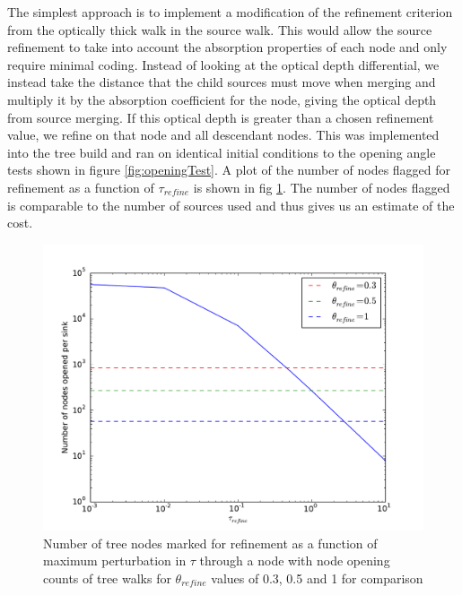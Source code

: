 The simplest approach is to implement a modification of the refinement criterion from the optically thick walk in the source walk. This would allow the source refinement to take into account the absorption properties of each node and only require minimal coding. Instead of looking at the optical depth differential, we instead take the distance that the child sources must move when merging and multiply it by the absorption coefficient for the node, giving the optical depth from source merging. If this optical depth is greater than a chosen refinement value, we refine on that node and all descendant nodes.
\iffalse
This was implemented into the tree build and ran on identical initial conditions to the opening angle tests shown in figure \ref{fig:openingTest}. A plot of the number of nodes flagged for refinement as a function of $\tau_{refine}$ is shown in fig \ref{fig:CSnumNodes}. The number of nodes flagged is comparable to the number of sources used and thus gives us an estimate of the cost.

\begin{figure} [H]
    \centering
    \includegraphics[width=\textwidth]{plots/CH4/CSOpeningTau.pdf}
    \caption{Number of tree nodes marked for refinement as a function of maximum perturbation in $\tau$ through a node with node opening counts of tree walks for $\theta_{refine}$ values of 0.3, 0.5 and 1 for comparison}
    \label{fig:CSnumNodes}
\end{figure}


